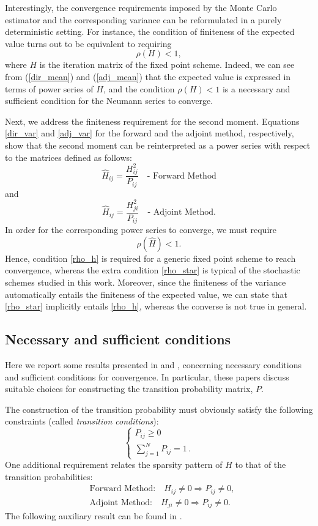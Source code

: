 \documentclass[times]{nlaauth}
\begin{document}
Interestingly,
the convergence requirements imposed by the Monte Carlo estimator and
the corresponding variance can be reformulated in a purely deterministic
setting.
For instance, the condition of finiteness of the expected value turns out to
be equivalent to requiring
\begin{equation}
 \rho(H)<1
 \label{rho_h},
\end{equation}
where $H$ is the iteration matrix of the fixed point scheme.
Indeed, we can see from (\ref{dir_mean}) and (\ref{adj_mean}) that the
expected value is expressed in terms of
power series of $H$, and the condition $\rho(H)<1$
is a necessary and sufficient condition for the Neumann series to
converge.

Next, we address the finiteness requirement for the second moment.
Equations \eqref{dir_var} and \eqref{adj_var}
for
the forward and the adjoint method, respectively, show that the second
moment can be reinterpreted as a power series with respect to the matrices
defined as follows:
\[
 \hat{H}_{ij}=\frac{H_{ij}^2}{P_{ij}} \quad \text{- Forward Method}
\]
and
\[
 \hat{H}_{ij}=\frac{H_{ji}^2}{P_{ij}} \quad \text{- Adjoint Method}.
\]
In order for the corresponding power series to
converge, we must require
\begin{equation}
 \rho(\hat{H})<1.
 \label{rho_star}
\end{equation}
Hence, condition \eqref{rho_h} is required for a generic fixed point scheme to
reach convergence, whereas the extra condition \eqref{rho_star} is typical of
the stochastic schemes studied in this work.
Moreover, since the finiteness of the variance automatically entails the
finiteness of the expected value, we can state that \eqref{rho_star}
implicitly entails \eqref{rho_h}, whereas the converse is not true in
general.

\subsection{Necessary and sufficient conditions}

Here we report some results presented in
\cite{Srin2010} and \cite{MASC2013},
concerning necessary conditions and sufficient conditions for convergence.
In particular, these papers discuss suitable choices for constructing the
transition probability matrix, $P$.

The construction of the transition probability must obviously satisfy the following
constraints (called \textit{transition conditions}):
\[
\begin{cases}
  P_{ij}\ge 0 \\
 \sum_{j=1}^N P_{ij}= 1 \,.
\end{cases}
\]
One additional requirement relates the sparsity pattern of $H$ to that
of the transition probabilities:
\begin{align*}
& \text{Forward Method:} \quad H_{ij}\ne 0 \Rightarrow P_{ij}\ne 0, \\ &
\text{Adjoint Method:} \quad H_{ji}\ne 0 \Rightarrow P_{ij}\ne 0.
\end{align*}
The following auxiliary result can be found in \cite{MASC2013}.
\end{document}
